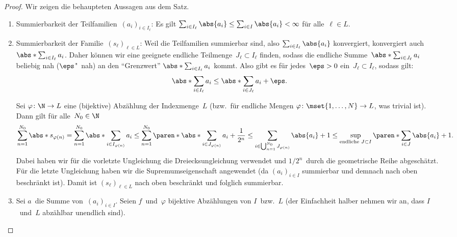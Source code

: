 \documentclass[a4paper]{article}
\begin{document}

\begin{proof}
    Wir zeigen die behaupteten Aussagen aus dem Satz.
    \begin{enumerate}
        \item Summierbarkeit der Teilfamilien~$(a_i)_{i\in I_\ell}$: Es gilt $\sum_{i\in I_\ell} \abs{a_i} \leq \sum_{i\in I} \abs{a_i} < \infty$ für alle~$\ell \in L$.
        \item Summierbarkeit der Familie~$(s_\ell)_{\ell\in L}$: Weil die Teilfamilien summierbar sind, also $\sum_{i\in I_\ell} \abs{a_i}$ konvergiert, konvergiert auch $\abs*{\sum_{i\in I_\ell} a_i}$. Daher können wir eine geeignete endliche Teilmenge~$J_\ell \subset I_\ell$ finden, sodass die endliche Summe~$\abs*{\sum_{i\in J_\ell} a_i}$ beliebig nah ($\eps$"~nah) an den "`Grenzwert"' $\abs*{\sum_{i\in I_\ell} a_i}$ kommt. Also gibt es für jedes~$\eps > 0$ ein~$J_\ell \subset I_\ell$, sodass gilt:
              \begin{equation*}
                  \abs*{\sum_{i\in I_\ell} a_i} \leq \abs*{\sum_{i\in J_\ell} a_i}+ \eps.
              \end{equation*}

              Sei $\varphi\colon \N\to L$ eine (bijektive) Abzählung der Indexmenge~$L$ (bzw.\ für endliche Mengen $\varphi\colon \mset{1,\dots,N} \to L$, was trivial ist). Dann gilt für alle~$N_0 \in \N$
              \begin{equation*}
                  \sum_{n=1}^{N_0} \abs*{s_{\varphi(n)}} = \sum_{n=1}^{N_0} \abs*{\sum_{i\in I_{\varphi(n)}} a_i} \leq  \sum_{n=1}^{N_0} \paren*{\abs*{\sum_{i\in J_{\varphi(n)}} a_i} + \frac{1}{2^n}} \leq \sum_{i\in\bigcup_{n=1}^{N_0} J_{\varphi(n)}} \abs{a_i} + 1 \leq \sup_{\text{endliche } J\subset I} \paren*{\sum_{i\in J} \abs{a_i} + 1}.
              \end{equation*}
              Dabei haben wir für die vorletzte Ungleichung die Dreiecksungleichung verwendet und $1/2^n$~durch die geometrische Reihe abgeschätzt. Für die letzte Ungleichung haben wir die Supremumseigenschaft angewendet (da $(a_i)_{i\in I}$ summierbar und demnach nach oben beschränkt ist). Damit ist $(s_\ell)_{\ell\in L}$ nach oben beschränkt und folglich summierbar.

        \item Sei $a$~die Summe von~$(a_i)_{i\in I}$. Seien $f$~und~$\varphi$ bijektive Abzählungen von $I$~bzw.~$L$ (der Einfachheit halber nehmen wir an, dass $I$~und~$L$ abzählbar unendlich sind).


\end{enumerate}
\end{proof}
\end{document}
